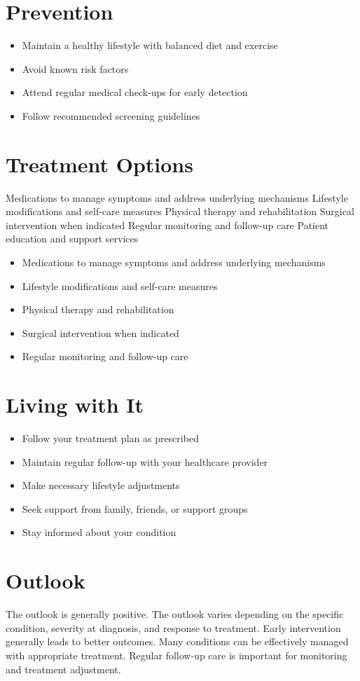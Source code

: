 \section{Prevention}
\begin{itemize}[noitemsep]
  \item Maintain a healthy lifestyle with balanced diet and exercise
  \item Avoid known risk factors
  \item Attend regular medical check-ups for early detection
  \item Follow recommended screening guidelines
\end{itemize}
\section{Treatment Options}
Medications to manage symptoms and address underlying mechanisms Lifestyle modifications and self-care measures Physical therapy and rehabilitation Surgical intervention when indicated Regular monitoring and follow-up care Patient education and support services

\begin{itemize}[noitemsep]
  \item Medications to manage symptoms and address underlying mechanisms
  \item Lifestyle modifications and self-care measures
  \item Physical therapy and rehabilitation
  \item Surgical intervention when indicated
  \item Regular monitoring and follow-up care
\end{itemize}
\section{Living with It}
\begin{itemize}[noitemsep]
  \item Follow your treatment plan as prescribed
  \item Maintain regular follow-up with your healthcare provider
  \item Make necessary lifestyle adjustments
  \item Seek support from family, friends, or support groups
  \item Stay informed about your condition
\end{itemize}
\section{Outlook}
The outlook is generally positive. The outlook varies depending on the specific condition, severity at diagnosis, and response to treatment. Early intervention generally leads to better outcomes. Many conditions can be effectively managed with appropriate treatment. Regular follow-up care is important for monitoring and treatment adjustment.
